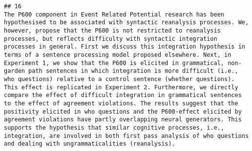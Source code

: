 \documentclass[
  english,
  man]{apa6}
\begin{document}
\begin{verbatim}
## 16                                                                                                                                                                                                                                                                                                                                                                                                                                                                                                                                                                                                                                                                                                                                                                                                                                                                                                                                                                                                                                                                                                                                                                                                                                                                                                                                                                                                                                                                                                    The P600 component in Event Related Potential research has been hypothesised to be associated with syntactic reanalysis processes. We, however, propose that the P600 is not restricted to reanalysis processes, but reflects difficulty with syntactic integration processes in general. First we discuss this integration hypothesis in terms of a sentence processing model proposed elsewhere. Next, in Experiment 1, we show that the P600 is elicited in grammatical, non-garden path sentences in which integration is more difficult (i.e., who questions) relative to a control sentence (whether questions). This effect is replicated in Experiment 2. Furthermore, we directly compare the effect of difficult integration in grammatical sentences to the effect of agreement violations. The results suggest that the positivity elicited in who questions and the P600-effect elicited by agreement violations have partly overlapping neural generators. This supports the hypothesis that similar cognitive processes, i.e., integration, are involved in both first pass analysis of who questions and dealing with ungrammaticalities (reanalysis).

\end{verbatim}
\end{document}
